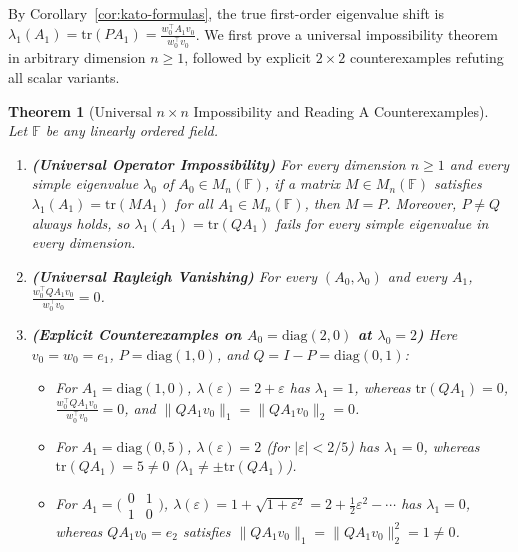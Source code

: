 \documentclass[11pt,a4paper]{article}
\newtheorem{theorem}{Theorem}[section]
\theoremstyle{definition}
\newcommand{\tr}{\mathrm{tr}}
\newcommand{\diag}{\mathrm{diag}}
\begin{document}
By Corollary~\ref{cor:kato-formulas}, the true first-order eigenvalue shift is
$\lambda_1(A_1) = \tr(P A_1) = \frac{w_0^\top A_1 v_0}{w_0^\top v_0}$. We first prove a
universal impossibility theorem in arbitrary dimension $n \ge 1$, followed by explicit
$2 \times 2$ counterexamples refuting all scalar variants.

\begin{theorem}[Universal $n \times n$ Impossibility and Reading A Counterexamples]\label{thm:readingA}
Let $\mathbb{F}$ be any linearly ordered field.
\begin{enumerate}
  \item \textbf{(Universal Operator Impossibility)} For \emph{every} dimension $n \ge 1$
  and \emph{every} simple eigenvalue $\lambda_0$ of $A_0 \in M_n(\mathbb{F})$, if a
  matrix $M \in M_n(\mathbb{F})$ satisfies $\lambda_1(A_1) = \tr(M A_1)$ for all
  $A_1 \in M_n(\mathbb{F})$, then $M = P$. Moreover, $P \neq Q$ always holds, so
  $\lambda_1(A_1) = \tr(Q A_1)$ fails for every simple eigenvalue in every dimension.
  \item \textbf{(Universal Rayleigh Vanishing)} For every $(A_0, \lambda_0)$ and every
  $A_1$, $\frac{w_0^\top Q A_1 v_0}{w_0^\top v_0} = 0$.
  \item \textbf{(Explicit Counterexamples on $A_0 = \diag(2, 0)$ at $\lambda_0 = 2$)}
  Here $v_0 = w_0 = e_1$, $P = \diag(1, 0)$, and $Q = I - P = \diag(0, 1)$:
  \begin{itemize}
    \item[(i)] For $A_1 = \diag(1, 0)$, $\lambda(\varepsilon) = 2 + \varepsilon$ has
    $\lambda_1 = 1$, whereas $\tr(Q A_1) = 0$, $\frac{w_0^\top Q A_1 v_0}{w_0^\top v_0}
    = 0$, and $\|Q A_1 v_0\|_1 = \|Q A_1 v_0\|_2 = 0$.
    \item[(ii)] For $A_1 = \diag(0, 5)$, $\lambda(\varepsilon) = 2$ (for
    $|\varepsilon| < 2/5$) has $\lambda_1 = 0$, whereas $\tr(Q A_1) = 5 \neq 0$
    ($\lambda_1 \neq \pm\tr(Q A_1)$).
    \item[(iii)] For $A_1 = \bigl(\begin{smallmatrix} 0 & 1 \\ 1 & 0 \end{smallmatrix}\bigr)$,
    $\lambda(\varepsilon) = 1 + \sqrt{1 + \varepsilon^2} = 2 + \frac{1}{2}\varepsilon^2
    - \cdots$ has $\lambda_1 = 0$, whereas $Q A_1 v_0 = e_2$ satisfies
    $\|Q A_1 v_0\|_1 = \|Q A_1 v_0\|_2^2 = 1 \neq 0$.
  \end{itemize}
\end{enumerate}
\end{theorem}
\end{document}
